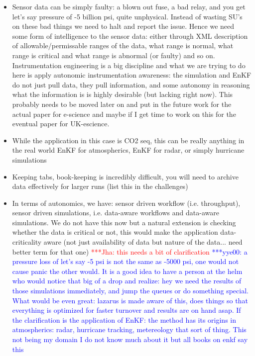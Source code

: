\documentclass[conference,final]{IEEEtran}
\newcommand{\jhanote}[1]{ {\textcolor{red} { ***Jha: #1 }}}
\newcommand{\yyenote}[1]{ {\textcolor{blue} { ***yye00: #1 }}}
\newcommand{\jhanote}[1]{}
\newcommand{\yyenote}[1]{}
\begin{document}
\begin{itemize}
\item Sensor data can be simply faulty: a blown out fuse, a bad relay, and you get let's say pressure of -5 billion psi, quite unphysical. Instead of wasting SU's on these bad things we need to halt and report the issue. Hence we need some form of intelligence to the sensor data: either through XML description of allowable/permissable ranges of the data, what range is normal, what range is critical and what range is abnormal (or faulty) and so on. Instrumentation engineering is a big discipline and what we are trying to do here is apply autonomic instrumentation awareness: the simulation and EnKF do not just pull data, they pull information, and some autonomy in reasoning what the information is is highly desirable (but lacking right now). This probably needs to be moved later on and put in the future work for the actual paper for e-science and maybe if I get time to work on this for the eventual paper for UK-escience.

\item While the application in this case is CO2 seq, this can be really anything in the real world EnKF for atmospherics, EnKF for radar, or simply hurricane simulations 

\item Keeping tabs, book-keeping is incredibly difficult, you will need to archive data effectively for larger runs (list this in the challenges) \item In terms of autonomics, we have: sensor driven workflow (i.e. throughput), sensor driven simulations, i.e. data-aware workflows and data-aware simulations. We do not have this now but a natural extension is checking whether the data is critical or not, this would make the application data-criticality aware (not just availability of data but nature of the data... need better term for that one) \jhanote{this needs a bit of clarification} \yyenote{a pressure loss of let's say -5 psi is not the same as -5000 psi, one would not cause panic the other would. It is a good idea to have a person at the helm who would notice that big of a drop and realize: hey we need the results of those simulations immediately, and jump the queues or do something special. What would be even great: lazarus is made aware of this, does things so that everything is optimized for faster turnover and results are on hand asap. If the clarification is the application of EnKF: the method has its origins in atmospherics: radar, hurricane tracking, metereology that sort of thing. This not being my domain I do not know much about it but all books on enkf say this}


\end{itemize}
\end{document}
